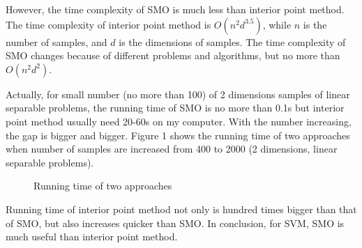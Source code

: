 \documentclass[22pt]{article}
\begin{document}
	However, the time complexity of SMO is much less than interior point method. The time complexity of interior point method is $O(n^2d^{3.5})$, while $n$ is the number of samples, and $d$ is the dimensions of samples. The time complexity of SMO changes because of different problems and algorithms, but no more than $O(n^2d^2)$. 

	Actually, for small number (no more than 100) of 2 dimensions samples of linear separable problems, the running time of SMO is no more than 0.1s but interior point method usually need 20-60s on my computer. With the number increasing, the gap is bigger and bigger. Figure 1 shows the running time of two approaches when number of samples are  increased from 400 to 2000 (2 dimensions, linear separable problems).

	\begin{figure}[H]
				\centering
				\caption{Running time of two approaches}
			\end{figure}
	
	Running time of interior point method not only is hundred times bigger than that of SMO, but also increases quicker than SMO. In conclusion, for SVM, SMO is much useful than interior point method.
\end{document}
